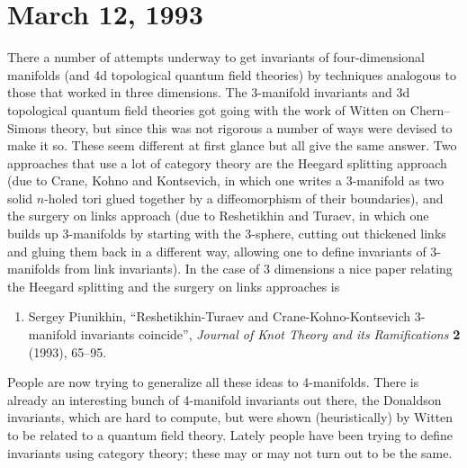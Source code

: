 \documentclass{article}
\def\tightlist{}
\renewcommand{\texttt}[1]{%
  \begingroup
  \ttfamily
  \begingroup\lccode`~=`/\lowercase{\endgroup\def~}{/\discretionary{}{}{}}%
  \begingroup\lccode`~=`[\lowercase{\endgroup\def~}{[\discretionary{}{}{}}%
  \begingroup\lccode`~=`.\lowercase{\endgroup\def~}{.\discretionary{}{}{}}%
  \catcode`/=\active\catcode`[=\active\catcode`.=\active
  \scantokens{#1\noexpand}%
  \endgroup
}
\begin{document}
\hypertarget{week9}{%
\section{March 12, 1993}\label{week9}}


There a number of attempts underway to get invariants of
four-dimensional manifolds (and 4d topological quantum field theories)
by techniques analogous to those that worked in three dimensions. The
3-manifold invariants and 3d topological quantum field theories got
going with the work of Witten on Chern--Simons theory, but since this was
not rigorous a number of ways were devised to make it so. These seem
different at first glance but all give the same answer. Two approaches
that use a lot of category theory are the Heegard splitting approach
(due to Crane, Kohno and Kontsevich, in which one writes a 3-manifold as
two solid \(n\)-holed tori glued together by a diffeomorphism of their
boundaries), and the surgery on links approach (due to Reshetikhin and
Turaev, in which one builds up 3-manifolds by starting with the
3-sphere, cutting out thickened links and gluing them back in a
different way, allowing one to define invariants of 3-manifolds from
link invariants). In the case of 3 dimensions a nice paper relating the
Heegard splitting and the surgery on links approaches is

\begin{enumerate}
\def\labelenumi{\arabic{enumi})}
\setcounter{enumi}{1}
\item
 Sergey Piunikhin, ``Reshetikhin-Turaev and Crane-Kohno-Kontsevich 3-manifold invariants
coincide'', \emph{Journal of Knot Theory and its Ramifications} \textbf{2} (1993), 65--95.
\end{enumerate}

People are now trying to generalize all these ideas to 4-manifolds.
There is already an interesting bunch of 4-manifold invariants out
there, the Donaldson invariants, which are hard to compute, but were
shown (heuristically) by Witten to be related to a quantum field theory.
Lately people have been trying to define invariants using category
theory; these may or may not turn out to be the same.
\end{document}
